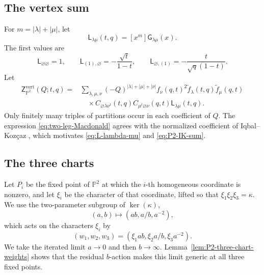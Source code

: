 \documentclass{amsart}
\theoremstyle{definition}
\numberwithin{equation}{section}
\begin{document}
\subsection{The vertex sum}
For \(m=|\lambda|+|\mu|\), let
\begin{equation}
 \mathsf L_{\lambda\mu}(t,q)
 =
 [x^m]\mathsf G_{\lambda\mu}(x).
\label{eq:L-lambda-mu}
\end{equation}
The first values are
\begin{equation}
 \mathsf L_{\varnothing\varnothing}=1,
 \qquad
 \mathsf L_{(1),\varnothing}=-\frac{\sqrt t}{1-t},
 \qquad
 \mathsf L_{\varnothing,(1)}
 =-\frac{t}{\sqrt q(1-t)}.
\label{eq:two-leg-first-coefficients}
\end{equation}
Let
\begin{equation}
\begin{aligned}
 \mathsf Z_{\mathbb P^2}^{\mathrm{vert}}(Q;t,q)
 ={}&\sum_{\lambda,\mu,\nu}
 (-Q)^{|\lambda|+|\mu|+|\nu|}
 f_\nu(q,t)^2
 \widetilde f_\lambda(t,q)\widetilde f_\mu(q,t)\\
 &\quad\times
 C_{\varnothing\lambda\nu^t}(t,q)
 C_{\mu^t\varnothing\nu}(q,t)
 \mathsf L_{\lambda\mu}(t,q).
\end{aligned}
\label{eq:P2-IK-sum}
\end{equation}
Only finitely many triples of partitions occur in each coefficient of \(Q\).  The expression \eqref{eq:two-leg-Macdonald} agrees with the normalized coefficient of Iqbal--Koz\c{c}az \cite[Section~4]{IqbalKozcaz}, which motivates \eqref{eq:L-lambda-mu} and \eqref{eq:P2-IK-sum}.

\subsection{The three charts}
Let \(P_i\) be the fixed point of \(\mathbb P^2\) at which the \(i\)-th homogeneous coordinate is nonzero, and let \(\xi_i\) be the character of that coordinate, lifted so that \(\xi_1\xi_2\xi_3=\kappa\).  We use the two-parameter subgroup of \(\ker(\kappa)\),
\[
 (a,b)\longmapsto(ab,a/b,a^{-2}),
\]
which acts on the characters \(\xi_i\) by
\begin{equation}
 (w_1,w_2,w_3)
 =(\xi_1ab,\xi_2a/b,\xi_3a^{-2}).
\label{eq:P2-iterated-cocharacter}
\end{equation}
We take the iterated limit \(a\to0\) and then \(b\to\infty\).  Lemma~\ref{lem:P2-three-chart-weights} shows that the residual \(b\)-action makes this limit generic at all three fixed points.
\end{document}

